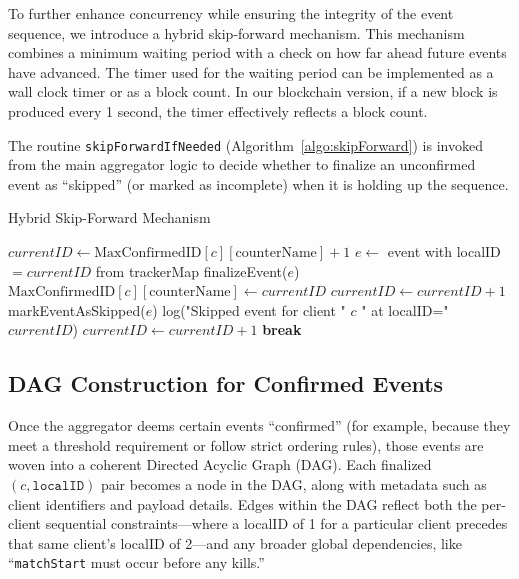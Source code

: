 \documentclass[11pt]{article}
\begin{document}
To further enhance concurrency while ensuring the integrity of the event sequence, we introduce a hybrid skip-forward mechanism. This mechanism combines a minimum waiting period with a check on how far ahead future events have advanced. The timer used for the waiting period can be implemented as a wall clock timer or as a block count. In our blockchain version, if a new block is produced every 1 second, the timer effectively reflects a block count.

The routine \texttt{skipForwardIfNeeded} (Algorithm~\ref{algo:skipForward}) is invoked from the main aggregator logic to decide whether to finalize an unconfirmed event as “skipped” (or marked as incomplete) when it is holding up the sequence.

\begin{algorithm}[H]
\scriptsize
\caption{Hybrid Skip-Forward Mechanism}
\label{algo:skipForward}
\begin{algorithmic}[1]
  \State $currentID \gets \text{MaxConfirmedID}[c][\text{counterName}] + 1$
    \State $e \gets$ event with localID $= currentID$ from trackerMap
      \State finalizeEvent($e$)
      \State $\text{MaxConfirmedID}[c][\text{counterName}] \gets currentID$
      \State $currentID \gets currentID + 1$
      \State markEventAsSkipped($e$)
      \State log("Skipped event for client " $c$ " at localID=" $currentID$)
      \State $currentID \gets currentID + 1$
    \Else
      \State \textbf{break} 
    \EndIf
  \EndWhile
\EndProcedure
\end{algorithmic}
\end{algorithm}


\subsection{DAG Construction for Confirmed Events}
\label{sec:dagConstructionExplanation}

Once the aggregator deems certain events “confirmed” (for example, because they meet a threshold requirement or follow strict ordering rules), those events are woven into a coherent Directed Acyclic Graph (DAG)\cite{dag_ledger}. Each finalized \((c,\texttt{localID})\) pair becomes a node in the DAG, along with metadata such as client identifiers and payload details. Edges within the DAG reflect both the per-client sequential constraints—where a localID of 1 for a particular client precedes that same client’s localID of 2—and any broader global dependencies, like “\texttt{matchStart} must occur before any kills.”
\end{document}
